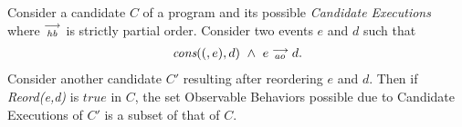 \begin{theorem} 
    \label{ThmReord}
    Consider a candidate $C$ of a program and its possible \textit{Candidate Executions} where $\stackrel{\longrightarrow}{_\textit{hb}}$ is strictly partial order. Consider two events $e$ and $d$ such that 
    \begin{align*}
        \textit{cons}((,e),d) \ \wedge \ e\stackrel{\longrightarrow}{_{ao}}d. 
    \end{align*}
    Consider another candidate $C'$ resulting after reordering $e$ and $d$. 
    Then if \emph{Reord(e,d)} is $true$ in $C$, the set Observable Behaviors possible due to Candidate Executions of $C'$ is a subset of that of $C$. 
\end{theorem}

